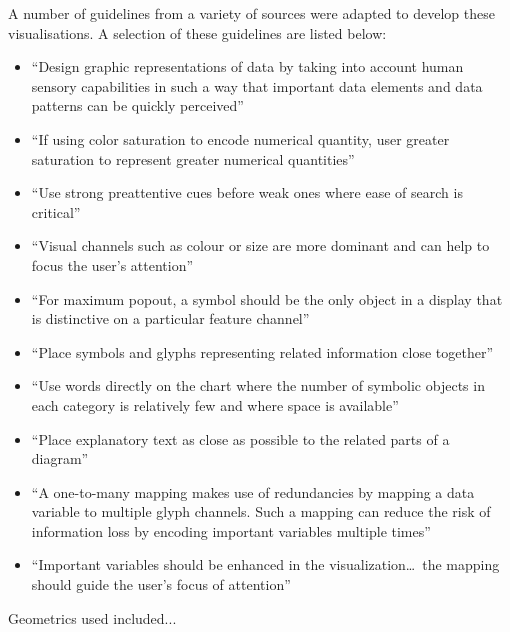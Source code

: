 A number of guidelines from a variety of sources were adapted to develop these visualisations. A selection of these guidelines are listed below:
\begin{itemize}
\item ``Design graphic representations of data by taking into account human sensory capabilities in such a way that important data elements and data patterns can be quickly perceived''~\cite[p.~14]{Ware2013a} 
\item ``If using color saturation to encode numerical quantity, user greater saturation to represent greater numerical quantities''~\cite[p.~117]{Ware2013a} 
\item ``Use strong preattentive cues before weak ones where ease of search is critical''~\cite[p.~156]{Ware2013a} 
\item ``Visual channels such as colour or size are more dominant and can help to focus the user's attention''~\cite[p.~45]{Borgo2013} 
\item ``For maximum popout, a symbol should be the only object in a display that is distinctive on a particular feature channel''~\cite[p.~157]{Ware2013a} 
\item ``Place symbols and glyphs representing related information close together''~\cite[p.~181]{Ware2013a} 
\item ``Use words directly on the chart where the number of symbolic objects in each category is relatively few and where space is available''~\cite[p.~321]{Ware2013a} 
\item ``Place explanatory text as close as possible to the related parts of a diagram''~\cite[p.~333]{Ware2013a} 
\item ``A one-to-many mapping makes use of redundancies by mapping a data variable to multiple glyph channels. Such a mapping can reduce the risk of information loss by encoding important variables multiple times''~\cite[p.~52]{Borgo2013} 
\item ``Important variables should be enhanced in the visualization\ldots~the mapping should guide the user's focus of attention''~\cite[p.~52]{Borgo2013} 
\end{itemize}

Geometrics used included... \more

